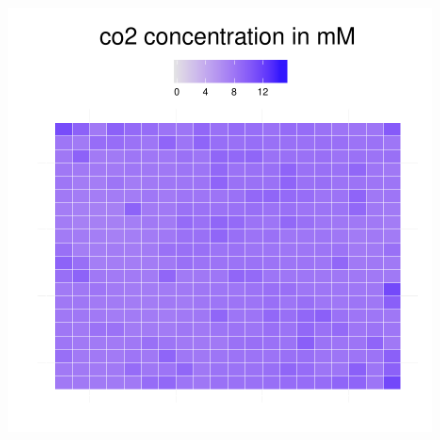 \begin{figure}[h!]
{\begin{minipage}[t]{0.3\textwidth}
  \end{minipage}
  \begin{minipage}[t]{0.3\textwidth}
    \includegraphics[width=\textwidth]{../results/img/barkeri_20x20_seed9659_co2100.pdf}
  \end{minipage}
  }
\end{figure}
